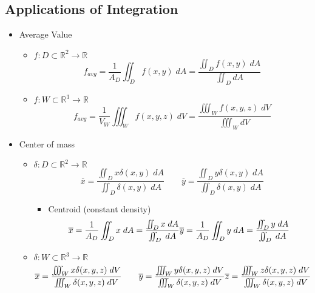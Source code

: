 \subsection{Applications of Integration}
	\begin{itemize}
		\item Average Value
			\begin{itemize}
				\item $f: D \subset \mathbb{R}^2 \rightarrow \mathbb{R}$
					\begin{equation}
						f_{avg} = \frac{1}{A_D} \iint_D f(x,y) \; dA = \frac{\iint_D f(x,y) \; dA}{\iint_D dA}
					\end{equation}
				\item $f: W \subset \mathbb{R}^3 \rightarrow \mathbb{R}$
					\begin{equation}
						f_{avg} = \frac{1}{V_W} \iiint_W f(x,y,z) \; dV = \frac{\iiint_W f(x,y,z) \; dV}{\iiint_W dV}
					\end{equation}
			\end{itemize}
		\item Center of mass
			\begin{itemize}
				\item $\delta: D \subset \mathbb{R}^2 \rightarrow \mathbb{R}$
					\begin{equation}
						\overline{x} = \frac{\iint_D x \delta(x,y) \; dA}{\iint_D \delta(x,y) \; dA} \qquad
						\overline{y} = \frac{\iint_D y \delta(x,y) \; dA}{\iint_D \delta(x,y) \; dA}
					\end{equation}
					\begin{itemize}
						\item Centroid (constant density)
							\begin{equation}
								\overline{x} = \frac{1}{A_D} \iint_D x \; dA = \frac{\iint_D x \; dA}{\iint_D \; dA} \\
								\overline{y} = \frac{1}{A_D} \iint_D y \; dA = \frac{\iint_D y \; dA}{\iint_D \; dA}
							\end{equation}
					\end{itemize}
				\item $\delta: W \subset \mathbb{R}^3 \rightarrow \mathbb{R}$
					\begin{equation}
						\overline{x} = \frac{\iiint_W x \delta(x,y,z) \; dV}{\iiint_W \delta(x,y,z) \; dV} \qquad
						\overline{y} = \frac{\iiint_W y \delta(x,y,z) \; dV}{\iiint_W \delta(x,y,z) \; dV} \\
						\overline{z} = \frac{\iiint_W z \delta(x,y,z) \; dV}{\iiint_W \delta(x,y,z) \; dV}

\end{equation}
\end{itemize}
\end{itemize}
